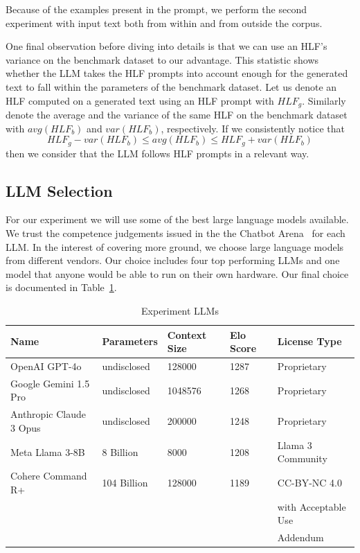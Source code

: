 \documentclass[runningheads,a4paper,11pt]{article}
\begin{document}
Because of the examples present in the prompt, we perform the second experiment
with input text both from within and from outside the corpus.

One final observation before diving into details is that we can use an HLF's
variance on the benchmark dataset to our advantage.
This statistic shows whether the LLM takes the HLF prompts into account enough
for the generated text to fall within the parameters of the benchmark dataset.
Let us denote an HLF computed on a generated text using an HLF prompt with
$HLF_g$.
Similarly denote the average and the variance of the same HLF on the benchmark
dataset with $avg(HLF_b)$ and $var(HLF_b)$, respectively.
If we consistently notice that
\[HLF_g - var(HLF_b) \leq avg(HLF_b) \leq HLF_g + var(HLF_b)\]
then we consider that the LLM follows HLF prompts in a relevant way.

\subsection{LLM Selection}\label{llm-selection}

For our experiment we will use some of the best large language models available.
We trust the competence judgements issued in the the Chatbot Arena~\cite{chiang2024chatbot}
for each LLM.
In the interest of covering more ground, we choose large language models from
different vendors.
Our choice includes four top performing LLMs and one model that anyone would be
able to run on their own hardware.
Our final choice is documented in Table~\ref{table-llm}.

\begin{table}[ht]
    \setlength\tabcolsep{6pt}
    \centering
    \begin{tabular}{@{}lllll@{}}
        \toprule
        Name                    & Parameters  & Context Size & Elo Score & License Type        \\ \toprule
        OpenAI GPT-4o           & undisclosed & 128000       & 1287      & Proprietary         \\
        Google Gemini 1.5 Pro   & undisclosed & 1048576      & 1268      & Proprietary         \\
        Anthropic Claude 3 Opus & undisclosed & 200000       & 1248      & Proprietary         \\
        Meta Llama 3-8B         & 8 Billion   & 8000         & 1208      & Llama 3 Community   \\
        Cohere Command R+       & 104 Billion & 128000       & 1189      & CC-BY-NC 4.0        \\
                                &             &              &           & with Acceptable Use \\
                                &             &              &           & Addendum            \\ \bottomrule
    \end{tabular}
    \caption{Experiment LLMs}\label{table-llm}
\end{table}
\end{document}
